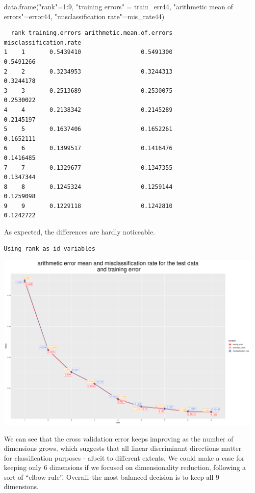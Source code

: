 \documentclass[
  letterpaper,
  DIV=11,
  numbers=noendperiod]{scrartcl}
\newenvironment{Shaded}{\begin{snugshade}}{\end{snugshade}}
\newcommand{\DecValTok}[1]{\textcolor[rgb]{0.68,0.00,0.00}{#1}}
\newcommand{\FunctionTok}[1]{\textcolor[rgb]{0.28,0.35,0.67}{#1}}
\newcommand{\NormalTok}[1]{\textcolor[rgb]{0.00,0.23,0.31}{#1}}
\newcommand{\OtherTok}[1]{\textcolor[rgb]{0.00,0.23,0.31}{#1}}
\newcommand{\SpecialCharTok}[1]{\textcolor[rgb]{0.37,0.37,0.37}{#1}}
\newcommand{\StringTok}[1]{\textcolor[rgb]{0.13,0.47,0.30}{#1}}
\begin{document}
\begin{Shaded}
\begin{Highlighting}[]
\FunctionTok{data.frame}\NormalTok{(}\StringTok{"rank"}\OtherTok{=}\DecValTok{1}\SpecialCharTok{:}\DecValTok{9}\NormalTok{, }\StringTok{"training errors"} \OtherTok{=}\NormalTok{ train\_err44, }
       \StringTok{"arithmetic mean of errors"}\OtherTok{=}\NormalTok{error44,}
\StringTok{"misclassification rate"}\OtherTok{=}\NormalTok{mis\_rate44)}
\end{Highlighting}
\end{Shaded}

\begin{verbatim}
  rank training.errors arithmetic.mean.of.errors misclassification.rate
1    1       0.5439410                 0.5491300              0.5491266
2    2       0.3234953                 0.3244313              0.3244178
3    3       0.2513689                 0.2530075              0.2530022
4    4       0.2138342                 0.2145289              0.2145197
5    5       0.1637406                 0.1652261              0.1652111
6    6       0.1399517                 0.1416476              0.1416485
7    7       0.1329677                 0.1347355              0.1347344
8    8       0.1245324                 0.1259144              0.1259098
9    9       0.1229118                 0.1242810              0.1242722
\end{verbatim}

As expected, the differences are hardly noticeable.

\begin{verbatim}
Using rank as id variables
\end{verbatim}

\includegraphics{ProblemSet2_files/figure-pdf/unnamed-chunk-77-1.pdf}

We can see that the cross validation error keeps improving as the number
of dimensions grows, which suggests that all linear discriminant
directions matter for classification purposes - albeit to different
extents. We could make a case for keeping only 6 dimensions if we
focused on dimensionality reduction, following a sort of ``elbow rule''.
Overall, the most balanced decision is to keep all 9 dimensions.
\end{document}
